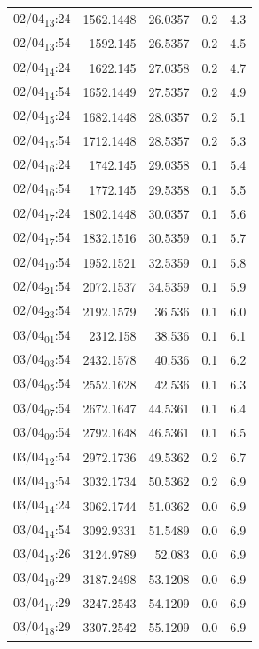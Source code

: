 \documentclass[11pt]{article}
\begin{document}
\begin{enumerate}
\begin{center}
\begin{tabular}{lrrrr}
02/04\textsubscript{13}:24 & 1562.1448 & 26.0357 & 0.2 & 4.3\\[0pt]
02/04\textsubscript{13}:54 & 1592.145 & 26.5357 & 0.2 & 4.5\\[0pt]
02/04\textsubscript{14}:24 & 1622.145 & 27.0358 & 0.2 & 4.7\\[0pt]
02/04\textsubscript{14}:54 & 1652.1449 & 27.5357 & 0.2 & 4.9\\[0pt]
02/04\textsubscript{15}:24 & 1682.1448 & 28.0357 & 0.2 & 5.1\\[0pt]
02/04\textsubscript{15}:54 & 1712.1448 & 28.5357 & 0.2 & 5.3\\[0pt]
02/04\textsubscript{16}:24 & 1742.145 & 29.0358 & 0.1 & 5.4\\[0pt]
02/04\textsubscript{16}:54 & 1772.145 & 29.5358 & 0.1 & 5.5\\[0pt]
02/04\textsubscript{17}:24 & 1802.1448 & 30.0357 & 0.1 & 5.6\\[0pt]
02/04\textsubscript{17}:54 & 1832.1516 & 30.5359 & 0.1 & 5.7\\[0pt]
02/04\textsubscript{19}:54 & 1952.1521 & 32.5359 & 0.1 & 5.8\\[0pt]
02/04\textsubscript{21}:54 & 2072.1537 & 34.5359 & 0.1 & 5.9\\[0pt]
02/04\textsubscript{23}:54 & 2192.1579 & 36.536 & 0.1 & 6.0\\[0pt]
03/04\textsubscript{01}:54 & 2312.158 & 38.536 & 0.1 & 6.1\\[0pt]
03/04\textsubscript{03}:54 & 2432.1578 & 40.536 & 0.1 & 6.2\\[0pt]
03/04\textsubscript{05}:54 & 2552.1628 & 42.536 & 0.1 & 6.3\\[0pt]
03/04\textsubscript{07}:54 & 2672.1647 & 44.5361 & 0.1 & 6.4\\[0pt]
03/04\textsubscript{09}:54 & 2792.1648 & 46.5361 & 0.1 & 6.5\\[0pt]
03/04\textsubscript{12}:54 & 2972.1736 & 49.5362 & 0.2 & 6.7\\[0pt]
03/04\textsubscript{13}:54 & 3032.1734 & 50.5362 & 0.2 & 6.9\\[0pt]
03/04\textsubscript{14}:24 & 3062.1744 & 51.0362 & 0.0 & 6.9\\[0pt]
03/04\textsubscript{14}:54 & 3092.9331 & 51.5489 & 0.0 & 6.9\\[0pt]
03/04\textsubscript{15}:26 & 3124.9789 & 52.083 & 0.0 & 6.9\\[0pt]
03/04\textsubscript{16}:29 & 3187.2498 & 53.1208 & 0.0 & 6.9\\[0pt]
03/04\textsubscript{17}:29 & 3247.2543 & 54.1209 & 0.0 & 6.9\\[0pt]
03/04\textsubscript{18}:29 & 3307.2542 & 55.1209 & 0.0 & 6.9\\[0pt]
\end{tabular}
\end{center}



\end{enumerate}
\end{document}
